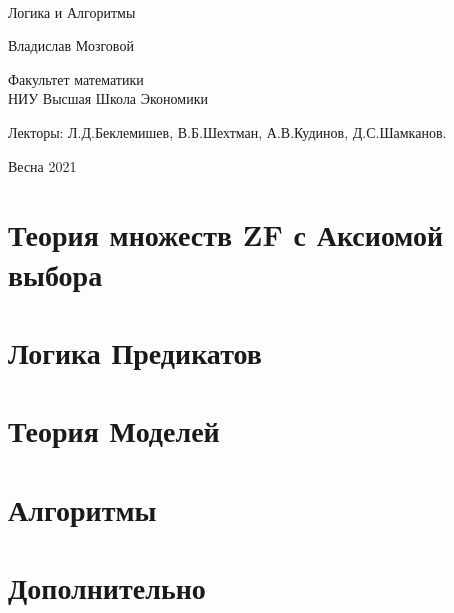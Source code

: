 \documentclass[11pt,a4paper,oldfontcommands]{memoir}
\theoremstyle{definition}
\theoremstyle{remark}
\begin{document}
	
	\thispagestyle{empty}
	
	{%
		\sffamily
		\centering
		\Large
		
		~\vspace{\fill}
		
		{\huge 
			Логика и Алгоритмы
		}
		
		\vspace{2.5cm}
		
		{\LARGE
			Владислав Мозговой
		}
		
		\vspace{4.5cm}
		Факультет математики\\
		НИУ Высшая Школа Экономики
		
		\vspace{3.5cm}
		
		Лекторы: Л.Д.Беклемишев, В.Б.Шехтман, А.В.Кудинов, Д.С.Шамканов.
		
		\vspace{\fill}
		
		Весна 2021
		
	}%
	
	\cleardoublepage
	
	\tableofcontents*
	
	\clearpage
	
	
	\chapter{Теория множеств ZF с Аксиомой выбора}
	
	
	
	
	
	
	
	
	\chapter{Логика Предикатов}
	
	
	
	

	\chapter{Теория Моделей}
	
	
	
	
	
	

	\chapter{Алгоритмы}
	
	

	\chapter{Дополнительно}
	
	
	
	
	
\end{document}
